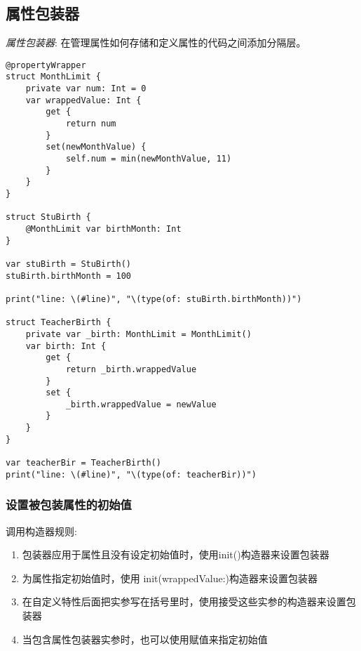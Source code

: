 \documentclass{../main.tex}{subfiles}
\begin{document}
\subsection{属性包装器}
\emph{属性包装器}: 在管理属性如何存储和定义属性的代码之间添加分隔层。

\begin{lstlisting}[style = lstCodeStyleSwift, caption = {属性包装器基本语法}]
@propertyWrapper
struct MonthLimit {
    private var num: Int = 0
    var wrappedValue: Int {
        get {
            return num
        }
        set(newMonthValue) {
            self.num = min(newMonthValue, 11)
        }
    }
}

struct StuBirth {
    @MonthLimit var birthMonth: Int
}

var stuBirth = StuBirth()
stuBirth.birthMonth = 100

print("line: \(#line)", "\(type(of: stuBirth.birthMonth))")

struct TeacherBirth {
    private var _birth: MonthLimit = MonthLimit()
    var birth: Int {
        get {
            return _birth.wrappedValue
        }
        set {
            _birth.wrappedValue = newValue
        }
    }
}

var teacherBir = TeacherBirth()
print("line: \(#line)", "\(type(of: teacherBir))")

\end{lstlisting}

\subsubsection{设置被包装属性的初始值}
调用构造器规则:
\begin{enumerate}[itemsep=0pt, parsep=0pt, topsep=0pt, partopsep=0pt]
  \item 包装器应用于属性且没有设定初始值时，使用init()构造器来设置包装器
  \item 为属性指定初始值时，使用 init(wrappedValue:)构造器来设置包装器
  \item 在自定义特性后面把实参写在括号里时，使用接受这些实参的构造器来设置包装器
  \item 当包含属性包装器实参时，也可以使用赋值来指定初始值
\end{enumerate}
\end{document}
